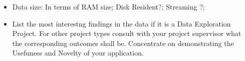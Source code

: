 {\begin{itemize}
\begin{itemize}
\item{}
    	Data size: In terms of  RAM size;  Disk Resident?; Streaming ?;  
    \item{}
    	List the most interestng findings in the data if it is a Data Exploration Project. For other project types consult with your project supervisor what the corresponding outcomes shall be. Concentrate on demonstrating the Usefuness and Novelty of your application.
\end{itemize}
\end{itemize}
}
